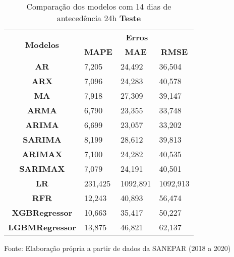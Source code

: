 \begin{table}[H]
	\centering
	\caption{Comparação dos modelos com 14 dias de antecedência 24h \textbf{Teste} }\label{tb:30-24tst}
	\begin{tabular}{@{}clll@{}}
		\toprule
		\multirow{2}{*}{\textbf{Modelos}} & \multicolumn{3}{c}{\textbf{Erros}}                                                                       \\ \cmidrule(l){2-4} 
		& \multicolumn{1}{c}{\textbf{MAPE}} & \multicolumn{1}{c}{\textbf{MAE}} & \multicolumn{1}{c}{\textbf{RMSE}} \\ \hline
\textbf{AR}                       & 7,205                             & 24,492                           & 36,504                            \\
\textbf{ARX}                      & 7,096                             & 24,283                           & 40,578                            \\
\textbf{MA}                       & 7,918                             & 27,309                           & 39,147                            \\
\textbf{ARMA}                     & 6,790                             & 23,355                           & 33,748                            \\
\textbf{ARIMA}                    & 6,699                             & 23,057                           & 33,202                            \\
\textbf{SARIMA}                   & 8,199                             & 28,612                           & 39,813                            \\
\textbf{ARIMAX}                   & 7,100                             & 24,282                           & 40,535                            \\
\textbf{SARIMAX}                  & 7,079                             & 24,191                           & 40,501                            \\
\textbf{LR}        & 231,425                           & 1092,891                         & 1092,913                          \\
\textbf{RFR}  & 12,243                            & 40,893                           & 56,474                            \\
\textbf{XGBRegressor}             & 10,663                            & 35,417                           & 50,227                            \\
\textbf{LGBMRegressor}            & 13,875                            & 46,821                           & 62,137                            \\ \bottomrule
	\end{tabular}

Fonte: Elaboração própria a partir de dados da SANEPAR (2018 a 2020)
\end{table}

